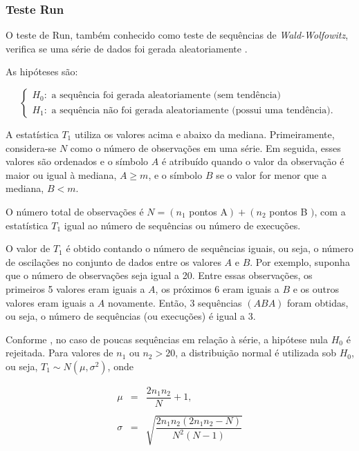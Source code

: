 \subsubsection{Teste Run}

O teste de Run, também conhecido como teste de sequências de \textit{Wald-Wolfowitz}, verifica se uma série de dados foi gerada aleatoriamente \cite{PAIVA}.

As hipóteses são:

\begin{equation}
	\left\{\begin{array}{l}
	H_0: \text { a sequência foi gerada aleatoriamente (sem tendência) } \\
	H_1: \text { a sequência não foi gerada aleatoriamente (possui uma tendência). }
\end{array}\right.
\end{equation}

A estatística $T_1$ utiliza os valores acima e abaixo da mediana. Primeiramente, considera-se $N$ como o número de observações em uma série. Em seguida, esses valores são ordenados e o símbolo $A$ é atribuído quando o valor da observação é maior ou igual à mediana, $A \geq m$, e o símbolo $B$ se o valor for menor que a mediana, $B<m$.

O número total de observações é $N=\left(n_1\right.$ pontos $\left.\mathrm{A}\right)+\left(n_2\right.$ pontos B $)$, com a estatística $T_1$ igual ao número de sequências ou número de execuções.

O valor de $T_1$ é obtido contando o número de sequências iguais, ou seja, o número de oscilações no conjunto de dados entre os valores $A$ e $B$. Por exemplo, suponha que o número de observações seja igual a 20. Entre essas observações, os primeiros 5 valores eram iguais a $A$, os próximos 6 eram iguais a $B$ e os outros valores eram iguais a $A$ novamente. Então, 3 sequências $(A B A)$ foram obtidas, ou seja, o número de sequências (ou execuções) é igual a 3.

Conforme , no caso de poucas sequências em relação à série, a hipótese nula $H_0$ é rejeitada. Para valores de $n_1$ ou $n_2>20$, a distribuição normal é utilizada sob $H_0$, ou seja, $T_1 \sim N\left(\mu, \sigma^2\right)$, onde

\begin{eqnarray}
	\mu&=&\dfrac{2 n_1 n_2}{N}+1, \\
	\nonumber\\
	 \sigma&=&\sqrt{\dfrac{2 n_1 n_2\left(2 n_1 n_2-N\right)}{N^2(N-1)}} 
\end{eqnarray}



